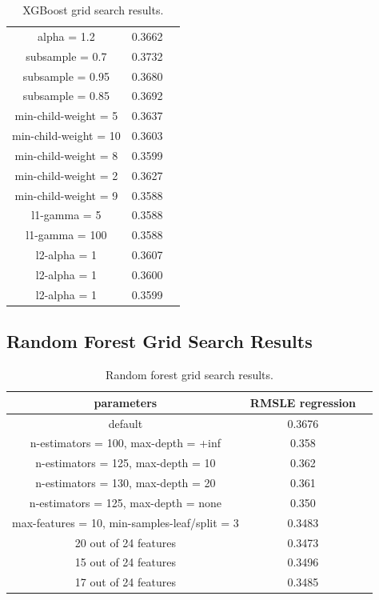 \documentclass[a4paper]{article}
\begin{document}
\begin{table}[H]
\begin{tabular}{ccc}
        alpha = 1.2 & 0.3662 \\
        subsample = 0.7 & 0.3732 \\
        subsample = 0.95 & 0.3680 \\
        subsample = 0.85& 0.3692 \\
        min-child-weight = 5 & 0.3637 \\
        min-child-weight = 10 & 0.3603 \\
        min-child-weight = 8 & 0.3599 \\
        min-child-weight = 2 & 0.3627 \\
        min-child-weight = 9 & 0.3588 \\
        l1-gamma = 5 & 0.3588 \\
        l1-gamma = 100 & 0.3588 \\
        l2-alpha = 1 & 0.3607 \\
        l2-alpha = 1 & 0.3600 \\
        l2-alpha = 1 & 0.3599 \\
        \hline
    \end{tabular}
    \caption{XGBoost grid search results.}
    \label{xgb_results}
\end{table}

\subsection{Random Forest Grid Search Results}
\begin{table}[H]
    \centering
    \begin{tabular}{ccc}
        parameters & RMSLE regression\\
        \hline
        default & 0.3676 \\
        n-estimators = 100, max-depth = +inf & 0.358 \\
        n-estimators = 125, max-depth = 10 & 0.362 \\
        n-estimators = 130, max-depth = 20 & 0.361 \\
        n-estimators = 125, max-depth = none & 0.350 \\
        max-features = 10, min-samples-leaf/split = 3 & 0.3483 \\
        20 out of 24 features & 0.3473 \\
        15 out of 24 features & 0.3496 \\
        17 out of 24 features & 0.3485 \\
        \hline
    \end{tabular}
    \caption{Random forest grid search results.}
    \label{rf_results}
\end{table}
\end{document}
